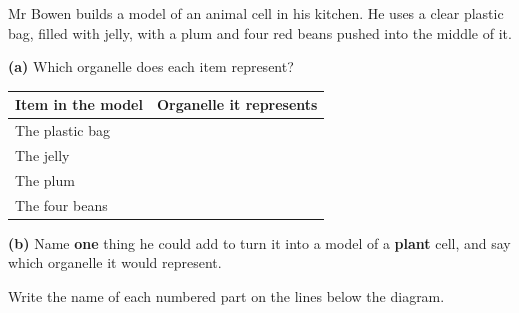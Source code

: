 \documentclass[12pt,a4paper]{article}
\begin{document}

\noindent Mr Bowen builds a model of an animal cell in his kitchen. He uses a clear
plastic bag, filled with jelly, with a plum and four red beans pushed into the middle
of it.

\vspace{8pt}
\noindent\textbf{(a)} Which organelle does each item represent?

\vspace{6pt}
\noindent
\begin{tabularx}{\textwidth}{|p{5cm}|X|}
  \hline
  \textbf{Item in the model} & \textbf{Organelle it represents} \\
  \hline
  The plastic bag \rule{0pt}{1.9em} & \\ \hline
  The jelly       \rule{0pt}{1.9em} & \\ \hline
  The plum        \rule{0pt}{1.9em} & \\ \hline
  The four beans  \rule{0pt}{1.9em} & \\ \hline
\end{tabularx}

\vspace{14pt}
\noindent\textbf{(b)} Name \textbf{one} thing he could add to turn it into a model of a
\textbf{plant} cell, and say which organelle it would represent.


\noindent Write the name of each numbered part on the lines below the diagram.
\end{document}
